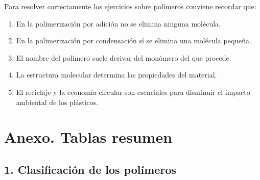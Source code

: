 
\begin{tcolorbox}[
title=Ideas fundamentales para la EBAU,
colback=blue!5,
colframe=blue!70!black]

Para resolver correctamente los ejercicios sobre polímeros conviene recordar que:

\begin{enumerate}

\item En la polimerización por adición no se elimina ninguna molécula.

\item En la polimerización por condensación sí se elimina una molécula pequeña.

\item El nombre del polímero suele derivar del monómero del que procede.

\item La estructura molecular determina las propiedades del material.

\item El reciclaje y la economía circular son esenciales para disminuir el impacto
ambiental de los plásticos.

\end{enumerate}

\end{tcolorbox}


\section*{Anexo. Tablas resumen}

\subsection*{1. Clasificación de los polímeros}

